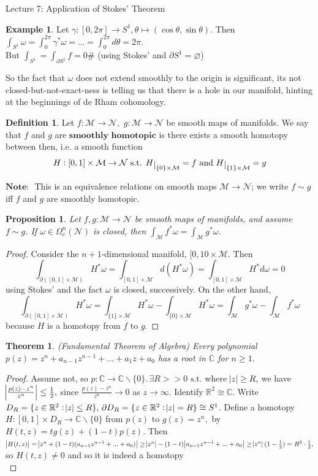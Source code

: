 \documentclass[10pt]{article}
\theoremstyle{plain}
\newtheorem{theorem}{Theorem}[section]
\newtheorem{prop}[thm]{Proposition}
\theoremstyle{definition}
\newtheorem{defn}[thm]{Definition} %
\newtheorem{exmp}[thm]{Example} %
\newcommand{\myand}{\text{ and }}
\newcommand{\st}{\text{ s.t. }}
\newcommand{\Note}{\textbf{Note: }}
\newcommand{\Real}{\mathbb{R}}
\newcommand{\man}{\mathcal{M}}
\newcommand{\nan}{\mathcal{N}}
\newcommand{\compactpformnan}[1]{\Omega^{#1}_c(\nan)}
\newcommand{\deriv}{d}
\newcommand{\dw}{d\omega}
\def\restrict#1{\raise-.5ex\hbox{\ensuremath|}_{#1}}
\begin{document}
\begin{section}{Lecture 7: Application of Stokes' Theorem}
\begin{exmp}
Let $\gamma : [0,2\pi] \to S^1, \theta \mapsto (\cos\theta,\sin\theta).$ Then $\int_{S^1} \omega = \int_0^{2\pi} \gamma^* \omega = ... = \int_0 ^{2\pi} \deriv \theta = 2\pi.$\\
But $\int_{S^1} = \int_{\partial S^1} f = 0 \#$ (using Stokes' and $\partial S^1 = \varnothing$)
\end{exmp}
So the fact that $\omega$ does not extend smoothly to the origin is significant, its not closed-but-not-exact-ness is telling us that there is a hole in our manifold, hinting at the beginnings of de Rham cohomology.
\begin{defn}
Let $f : \man \to \nan,$ $g:\man \to \nan$ be smooth maps of manifolds. We say that $f$ and $g$ are $\textbf{smoothly homotopic}$ is there exists a smooth homotopy between then, i.e. a smooth function 
$$H: [0,1] \times \man \to \nan \st H\restrict{\{0\} \times \man} = f \myand H\restrict{\{1\} \times\man} = g$$
\end{defn}
$\Note$ This is an equivalence relations on smooth maps $\man \to \nan$; we write $f \sim g$ iff $f$ and $g$ are smoothly homotopic.
\begin{prop}
Let $f,g : \man \to \nan$ be smooth maps of manifolds, and assume $f\sim g$. If $\omega \in \compactpformnan{n}$ is closed, then $\int_\man f ^* \omega = \int_\man g^* \omega$.
\end{prop}
\begin{proof}
Consider the $n+1$-dimensional manifold, $[0,10\times \man$. Then 
$$\int_{\partial ([0,1]\times \man)} H^*\omega = \int_{[0,1]\times \man} \deriv ( H^* \omega) = \int_{[0,1]\times\man} H^*\dw = 0$$
using Stokes' and the fact $\omega$ is closed, successively. On the other hand,
$$\int_{\partial ([0,1]\times \man)} H^* \omega = \int_{\{1\}\times \man} H^*\omega - \int_{\{0\}\times \man} H^*\omega = \int_\man g^*\omega - \int_\man f^* \omega$$
because $H$ is a homotopy from $f$ to $g$.
\end{proof}
\begin{theorem}
(Fundamental Theorem of Algebra) Every polynomial $p(z) = z^n + a_{n-1}z^{n-1} + ... + a_1 z + a_0$ has a root in $\mathbb{C}$ for $n \geq 1.$
\end{theorem}
\begin{proof}
Assume not, so $p: \mathbb{C} \to \mathbb{C}\backslash \{0\}.\, \exists R > > 0 \st$where $\abs{z} \geq R,$ we have $\abs{\frac{p(z)-z^n}{z^n}}\leq \frac{1}{2},$ since $\frac{p(z) - z^n}{z^n} \to 0$ as $z\to \infty.$ Identify $\Real^2 \cong \mathbb{C}$. Write $D_R = \{z\in \Real^2 : \abs{z} \leq R\},\, \partial D_R = \{z\in \Real^2 : \abs{z} = R\}\cong S^1$. Define a homotopy $H : [0,1] \times D_R \to \mathbb{C}\backslash\{0\}$ from $p(z)$ to $g(z) = z^n,$ by $H(t,z) = tg(z) + (1-t)p(z).$ Then $\abs{H(t,z)} = \abs{z^n +(1-t)(a_{n-1}z^{n-1} +...+a_0)}\geq \abs{z^n} -(1-t)\abs{a_{n-1}z^{n-1} + ... + a_0} \geq \abs{z^n}(1-\frac{1}{2}) = R^2 \cdot \frac{1}{2},$ so $H(t,z) \neq 0$ and so it is indeed a homotopy\\

\end{proof}
\end{section}
\end{document}
